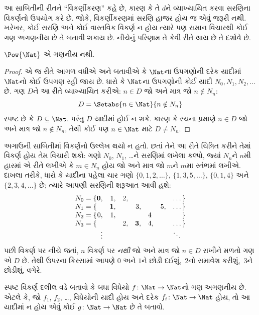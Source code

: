 \begin{explain}
આ સાબિતીની રીતને “વિકર્ણીકરણ” કહે છે, કારણ કે તે $d$ને વ્યાખ્યાયિત
કરવા સરણિના વિકર્ણનો ઉપયોગ કરે છે. જોકે, વિકર્ણીકરણમાં સરણિ હાજર
હોય જ એવું જરૂરી નથી. ખરેખર, કોઈ સરણિ અને કોઈ વાસ્તવિક વિકર્ણ ન
હોય ત્યારે પણ સમાન વિચારથી કોઈ ગણ અગણનીય છે તે બતાવી
શકાય છે. નીચેનું પરિણામ તે કેવી રીતે થાય છે તે દર્શાવે છે.
\end{explain}

\begin{thm}
$\Pow{\Nat}$ એ ગણનીય નથી.
\end{thm}

\begin{proof}
એ જ રીતે આગળ વધીએ અને બતાવીએ કે $\Nat$ના ઉપગણોની દરેક યાદીમાં
$\Nat$નો કોઈ ઉપગણ રહી જાય છે. ધારો કે $\Nat$ના ઉપગણોની કોઈ યાદી
$N_0, N_1, N_2, \ldots$ છે. ગણ $D$ને આ રીતે વ્યાખ્યાયિત કરીએ:
$n \in D$ જો અને માત્ર જો $n \notin N_{n}$:
\[
D = \Setabs{n \in \Nat}{n \notin N_n}
\]
સ્પષ્ટ છે કે $D\subseteq \Nat$. પરંતુ $D$ યાદીમાં હોઈ ન શકે.
કારણ કે રચના પ્રમાણે $n \in D$ જો અને માત્ર જો $n\notin N_n$,
તેથી કોઈ પણ $n \in \Nat$ માટે $D \neq N_n$.
\end{proof}

\begin{explain}
અગાઉની સાબિતીમાં વિકર્ણનો ઉલ્લેખ થયો ન હતો. છતાં તેને આ રીતે
ચિત્રિત કરીને તેમાં વિકર્ણ હોય તેમ વિચારી શકો: ગણો $N_0$, $N_1$,
\dots{}ને સરણિમાં લખેલા કલ્પો, જ્યાં $N_n$ને $n$મી હારમાં એ રીતે
લખીએ કે $m \in N_n$ હોય જો અને માત્ર જો $m$ને $m$મા સ્તંભમાં
લખીએ. દાખલા તરીકે, ધારો કે યાદીના પહેલા ચાર ગણો
$\{0,1,2,\dots\}$, $\{1, 3, 5, \dots\}$, $\{0,1,4\}$ અને
$\{2,3,4,\dots\}$ છે; ત્યારે આપણી સરણિની શરૂઆત આવી હશે:
\[
\begin{array}{r@{}rrrrrrr}
  N_0 = \{ & \mathbf{0}, & 1, & 2, & & & & \dots\}\\
  N_1 = \{ &  & \mathbf{1}, &  & 3, &  & 5, & \dots\}\\
  N_2 = \{ & 0, & 1, &  &  & 4\phantom{,} &  & \}\\
  N_3 = \{ &  &  & 2, & \mathbf{3}, & 4, & & \dots\}\\
  &\vdots & & & & & & \ddots\phantom{\}}
  \end{array}
\]
પછી વિકર્ણ પર નીચે જતાં, $n$ વિકર્ણ પર \emph{નથી} જો અને માત્ર જો
$n \in D$ રાખીને મળતો ગણ એ $D$ છે. તેથી ઉપરના કિસ્સામાં આપણે
$0$ અને $1$ને છોડી દઈશું,~$2$નો સમાવેશ કરીશું,~$3$ને છોડીશું, વગેરે.
\end{explain}

\begin{prob}
સ્પષ્ટ વિકર્ણ દલીલ વડે બતાવો કે બધા વિધેયો
$f \colon \Nat \to \Nat$નો ગણ અગણનીય છે. એટલે કે,
જો $f_1$, $f_2$, \dots, વિધેયોની યાદી હોય અને દરેક
$f_i\colon \Nat \to \Nat$ હોય, તો આ યાદીમાં ન હોય એવું કોઈ
$g \colon \Nat \to \Nat$ છે તે બતાવો.
\end{prob}
\endgroup

